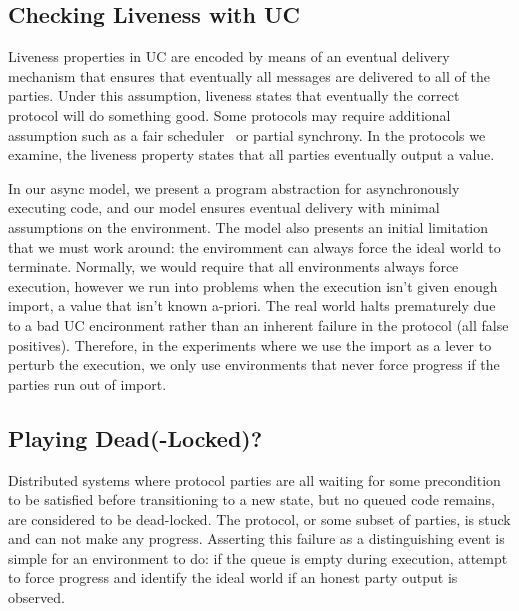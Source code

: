 
\subsection{Checking Liveness with UC}
Liveness properties in UC are encoded by means of an eventual delivery mechanism that ensures that eventually all messages are delivered to all of the parties.
Under this assumption, liveness states that eventually the correct protocol will do something good.
Some protocols may require additional assumption such as a fair scheduler~\cite{mmr} or partial synchrony.
In the protocols we examine, the liveness property states that all parties eventually output a value.

In our async model, we present a program abstraction for asynchronously executing code, and our model ensures eventual delivery with minimal assumptions on the environment.
The model also presents an initial limitation that we must work around: the enviromment can always force the ideal world to terminate.
Normally, we would require that all environments always force execution, however we run into problems when the execution isn't given enough import, a value that isn't known a-priori.
The real world halts prematurely due to a bad UC encironment rather than an inherent failure in the protocol (all false positives).
Therefore, in the experiments where we use the import as a lever to perturb the execution, we only use environments that never force progress if the parties run out of import.

\subsection{Playing Dead(-Locked)?}
Distributed systems where protocol parties are all waiting for some precondition to be satisfied before transitioning to a new state, but no queued code remains, are considered to be dead-locked.
The protocol, or some subset of parties, is stuck and can not make any progress.
Asserting this failure as a distinguishing event is simple for an environment to do: if the queue is empty during execution, attempt to force progress and identify the ideal world if an honest party output is observed.

